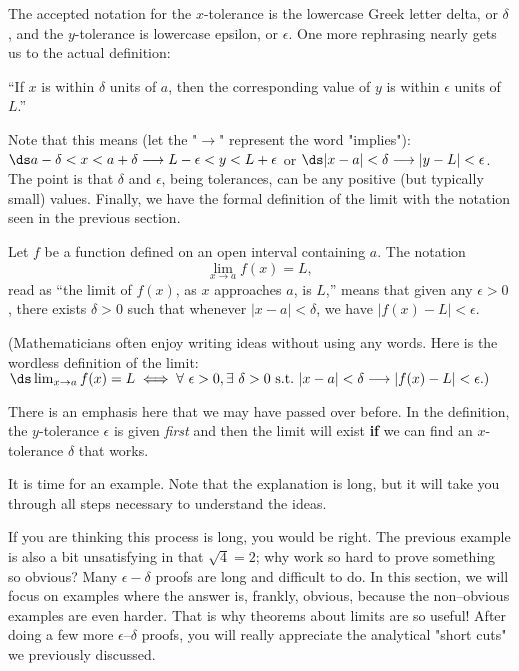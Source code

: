 The accepted notation for the $x$-tolerance is the lowercase Greek letter delta, or $\delta$, and the $y$-tolerance is lowercase epsilon, or $\epsilon$. One more rephrasing nearly gets us to the actual definition:

\begin{description}
\item ``If $x$ is within $\delta$ units of $a$, then the corresponding value of $y$ is within $\epsilon$ units of $L$.''
\end{description}

Note that this means (let the "$\longrightarrow$" represent the word "implies"):
$\ds a - \delta < x < a + \delta \longrightarrow L - \epsilon < y < L + \epsilon$ or  $\ds |x - a| < \delta \longrightarrow  |y - L| < \epsilon$. The point is that $\delta$ and $\epsilon$, being tolerances, can be any positive (but typically small) values.  Finally, we have the formal definition of the limit with the notation  seen in the previous section.

  \label{D:1.4.precise}%
{Let $f$ be a function defined on an open interval containing $a$. The notation $$\displaystyle \lim_{x\rightarrow a} f(x) = L,$$ read as ``the limit of $f(x)$, as $x$ approaches $a$, is $L$,'' 
means that given any $\epsilon > 0$, there exists $\delta > 0$ such that 
whenever $|x - a| < \delta$, we have $|f(x) - L| < \epsilon$.
}%

(Mathematicians often enjoy writing ideas without using any words. Here is the wordless definition of the limit:
{\small $ \ds \lim_{x \to a} f(x) = L \iff \forall \ \epsilon > 0, \exists \ \delta > 0 \ \mbox{s.t.} \ |x - a| < \delta \longrightarrow |f(x) - L| < \epsilon.) $}

There is an emphasis here that we may have passed over before.  In the definition, the $y$-tolerance $\epsilon$ is given \textit{first} and then the limit will exist {\bf if} we can find an $x$-tolerance $\delta$ that works.  

It is time for an example.  Note that the explanation is long, but it will take you through all steps necessary to understand the ideas.

 
If you are thinking this process is long, you would be right.  The previous example is also a bit unsatisfying in that $\sqrt{4}=2$; why work so hard to prove something so obvious? Many $\epsilon-\delta$ proofs are long and difficult to do. In this section, we will focus on examples where the answer is, frankly, obvious, because the non--obvious examples are even harder.  That is why theorems about limits are so useful! After doing a few more $\epsilon$--$\delta$ proofs, you will really appreciate the analytical "short cuts" we previously discussed. 

